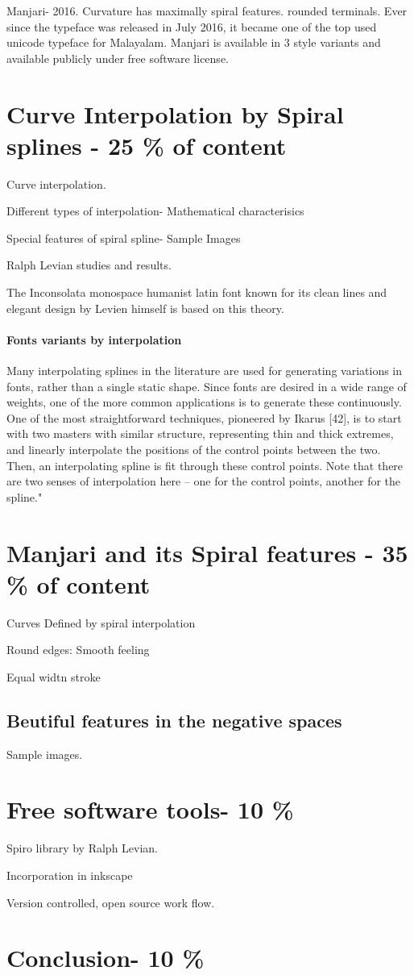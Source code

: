 \documentclass[10pt]{article}
\begin{document}
Manjari- 2016. Curvature has maximally spiral features. rounded terminals.  Ever since the typeface was released in July 2016, it became one of the top used unicode typeface for Malayalam. Manjari is available in 3 style variants and available publicly under free software license. 

\section{Curve Interpolation by Spiral splines - 25 \% of content}

Curve interpolation.

Different types of interpolation- Mathematical characterisics

Special features of spiral spline- Sample Images

Ralph Levian studies and results. 

The Inconsolata monospace humanist latin font known for its clean lines and elegant design by Levien himself is based on this theory.

\paragraph{Fonts variants by interpolation}
Many interpolating splines in the literature are used for generating variations in fonts, rather
than a single static shape. Since fonts are desired in a wide range of weights, one of the more
common applications is to generate these continuously. One of the most straightforward techniques,
pioneered by Ikarus [42], is to start with two masters with similar structure, representing thin
and thick extremes, and linearly interpolate the positions of the control points between the two.
Then, an interpolating spline is fit through these control points. Note that there are two senses of
interpolation here – one for the control points, another for the spline." 


\section{Manjari and its Spiral features - 35 \% of content}

Curves Defined by spiral interpolation

Round edges: Smooth feeling

Equal widtn stroke

\subsection{Beutiful features in the negative spaces}

Sample images.

\section{Free software tools- 10 \%}

Spiro library by Ralph Levian.

Incorporation in inkscape

Version controlled, open source work flow.

\section{Conclusion- 10 \%}
\end{document}
